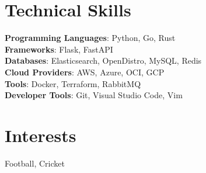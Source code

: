 \documentclass[letterpaper,11pt]{article}
\begin{document}
\section{Technical Skills}
 \begin{itemize}[leftmargin=0.15in, label={}]
    \small{\item{
     \textbf{Programming Languages}{: Python, Go, Rust} \\
     \textbf{Frameworks}{: Flask, FastAPI} \\
     \textbf{Databases}{: Elasticsearch, OpenDistro, MySQL, Redis} \\
     \textbf{Cloud Providers}{: AWS, Azure, OCI, GCP} \\
     \textbf{Tools}{: Docker, Terraform, RabbitMQ} \\
     \textbf{Developer Tools}{: Git, Visual Studio Code, Vim} \\
    }}
 \end{itemize}

\section{Interests}
    \begin{itemize}[leftmargin=0.15in, label={}]
    \small{\item{
        {Football, Cricket}
    }}
    \end{itemize}
\end{document}
